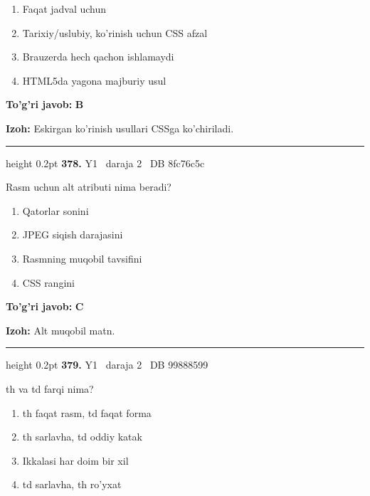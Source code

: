 \documentclass[10pt,a4paper,oneside]{article}
\begin{document}
\begin{enumerate}[label=\Alph*),leftmargin=9mm]
\item Faqat jadval uchun
\item Tarixiy/uslubiy, ko'rinish uchun CSS afzal
\item Brauzerda hech qachon ishlamaydi
\item HTML5da yagona majburiy usul
\end{enumerate}
\begin{tcolorbox}[enhanced,breakable,colback=teal!4,colframe=teal!45!black,boxrule=0.45pt,arc=1.2mm,left=2.8mm,right=2.8mm,top=2mm,bottom=2mm,before skip=2mm,after skip=2mm]
\textbf{\color{teal}To'g'ri javob:} \textbf{B}
\par\smallskip
\textbf{Izoh:} Eskirgan ko'rinish usullari CSSga ko'chiriladi.
\end{tcolorbox}
\vspace{2mm}\hrule height 0.2pt \vspace{4mm}
\hypertarget{q378}{\textbf{\color{ink}378.}}  {\color{muted}\scriptsize Y1 \textbullet\ daraja 2 \textbullet\ DB 8fc76c5c}
\par
Rasm uchun alt atributi nima beradi?
\begin{enumerate}[label=\Alph*),leftmargin=9mm]
\item Qatorlar sonini
\item JPEG siqish darajasini
\item Rasmning muqobil tavsifini
\item CSS rangini
\end{enumerate}
\begin{tcolorbox}[enhanced,breakable,colback=teal!4,colframe=teal!45!black,boxrule=0.45pt,arc=1.2mm,left=2.8mm,right=2.8mm,top=2mm,bottom=2mm,before skip=2mm,after skip=2mm]
\textbf{\color{teal}To'g'ri javob:} \textbf{C}
\par\smallskip
\textbf{Izoh:} Alt muqobil matn.
\end{tcolorbox}
\vspace{2mm}\hrule height 0.2pt \vspace{4mm}
\hypertarget{q379}{\textbf{\color{ink}379.}}  {\color{muted}\scriptsize Y1 \textbullet\ daraja 2 \textbullet\ DB 99888599}
\par
th va td farqi nima?
\begin{enumerate}[label=\Alph*),leftmargin=9mm]
\item th faqat rasm, td faqat forma
\item th sarlavha, td oddiy katak
\item Ikkalasi har doim bir xil
\item td sarlavha, th ro'yxat
\end{enumerate}
\end{document}
